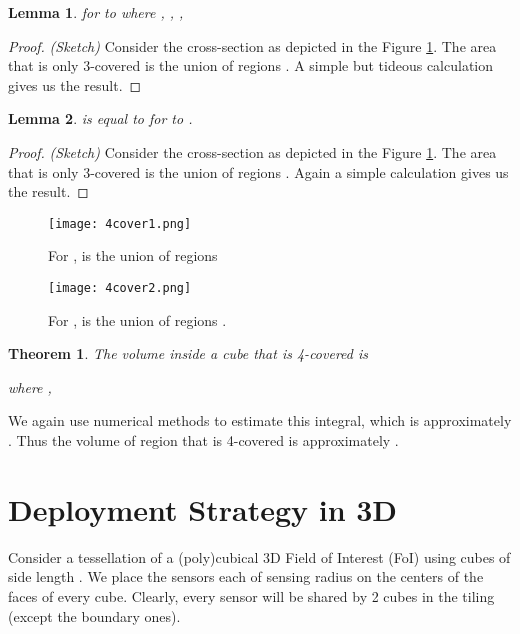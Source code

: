 \documentclass[conference]{IEEEtran}
\newtheorem{lemma}{Lemma}
\newtheorem{theorem}{Theorem}
\begin{document}
\begin{lemma}
 for  to  where , , , 
\end{lemma}
\begin{proof}
\emph{(Sketch)} Consider the cross-section as depicted in the Figure \ref{z5}. The area that is only 3-covered is the union of 
regions . A simple but tideous calculation gives us the result.   
\end{proof}


\begin{lemma}
 is equal to  for  to .
\end{lemma}
\begin{proof}
\emph{(Sketch)} Consider the cross-section as depicted in the Figure \ref{z5}. The area that is only 3-covered is the union of regions . 
Again a simple calculation gives us the result.   
\end{proof}

\begin{figure}
\centering
\texttt{[image: 4cover1.png]}
\caption{For ,  is the union of regions }
\label{z5}
\end{figure}


\begin{figure}
\centering
\texttt{[image: 4cover2.png]}
\caption{For ,  is the union of regions .}
\label{z6}
\end{figure}

\begin{theorem}
The volume  inside a cube that is 4-covered is   

where , 
\end{theorem}

We again use numerical methods to estimate this integral, which is approximately .
Thus the volume of region that is 4-covered is approximately .

\section{Deployment Strategy in 3D}

Consider a tessellation of a (poly)cubical 3D Field of Interest (FoI) using cubes
of side length . We place the sensors each of sensing radius
 on the centers of the faces of every cube.
Clearly, every sensor will be shared by 2 cubes in the tiling (except the boundary ones).
\end{document}
